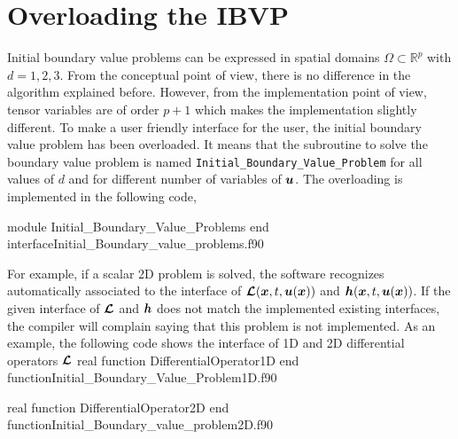       
 
 \newpage         
 \section{Overloading the IBVP}
 Initial boundary value problems can be expressed in spatial domains   $\Omega \subset \mathbb{ R}^p$ with $ d=1, 2, 3 $. 
 From the conceptual point of view, there is no difference in the algorithm explained before. However, from the implementation point of view, 
 tensor variables are of order $p+1$ which makes the implementation slightly different. To make a user friendly interface for the user, the initial boundary value problem has been overloaded. It means that the subroutine to solve the boundary value problem is named \verb|Initial_Boundary_Value_Problem| for all values of $ d $ and for different number of variables of $ \boldsymbol{u} $.  
 The overloading is implemented in the following code, 
 
  \vspace{0.5cm} 
        {module Initial_Boundary_Value_Problems}
        {end interface}{Initial_Boundary_value_problems.f90}
        
        
 For example, if a scalar 2D problem is solved, the software recognizes automatically associated to the interface  of $  \boldsymbol{\mathcal{L}} (\boldsymbol{x}, t, \boldsymbol{u}(\boldsymbol{x})) $ and $  \boldsymbol{h} (\boldsymbol{x},t, \boldsymbol{u}(\boldsymbol{x})) $. If the given interface of $ \boldsymbol{\mathcal{L}} $ and $ \boldsymbol{h}$ does not match the implemented existing interfaces, the compiler will complain saying that this problem is not implemented. 
 As an example, the following code shows the interface of 1D and 2D differential operators $ \boldsymbol{\mathcal{L}} $
  \vspace{0.5cm} 
        {real function DifferentialOperator1D}
        {end function}{Initial_Boundary_Value_Problem1D.f90}
  
        {real function DifferentialOperator2D}
        {end function}{Initial_Boundary_value_problem2D.f90}
 
 
  
       
   
       
     
\newpage 
